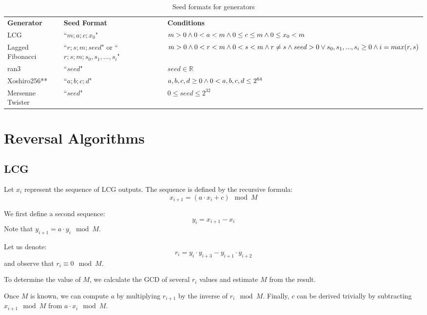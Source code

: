\documentclass[12pt, a4paper]{report}
\begin{document}
\begin{table}
\begin{xltabular}{\textwidth}{| >{\raggedright\arraybackslash}X | >{\raggedright\arraybackslash}X | >{\raggedright\arraybackslash}X |}
	\caption{Seed formats for generators}
	\label{table:1}\\
	\hline
	\bf{Generator} & \bf{Seed Format} & \bf{Conditions} \\
	\hhline{|=|=|=|}
	LCG & 
	``$m;a;c;x_0$" & 
	$m > 0 \wedge\break 0 < a < m \wedge\break 0\leq c \leq m \wedge\break 0 \leq x_0 < m$\\
	\hline
	Lagged Fibonacci & 
	``$r;s;m;seed$" or \break ``$r;s;m;s_0, s_1, ..., s_i$" & 
	$m > 0 \wedge\break 0 < r < m \wedge\break 0 < s < m \wedge\break r \neq s \wedge\break\break seed > 0 \vee\break
	s_0, s_1, ..., s_i \geq 0 \wedge\break i = max(r, s)$\\
	\hline
	ran3 &
	``$seed$" & 
  $seed \in \mathds{R}$\\
	\hline
	Xoshiro256** &
	``$a;b;c;d$" & 
	$a,b,c,d \ge 0 \wedge\break 0 < a,b,c,d \leq 2^{64}$ \\
	\hline
	Mersenne Twister&
	``$seed$" &
	$0 \leq seed \leq 2^{32}$ \\
	\hline
\end{xltabular}
\end{table}

\chapter{Reversal Algorithms}
\section{LCG}
Let $x_i$ represent the sequence of LCG outputs. The sequence is defined by the recursive formula:
$$x_{i+1} = (a \cdot x_i + c) \mod M$$

We first define a second sequence:
$$y_{i} = x_{i+1} - x_{i}$$ 
Note that $y_{i+1} = a \cdot y_{i} \mod M$.

Let us denote:
$$r_i = y_{i} \cdot y_{i+3} - y_{i+1} \cdot y_{i+2}$$
and observe that $r_i \equiv 0 \mod M$.

To determine the value of $M$, we calculate the GCD of several $r_i$ values and estimate $M$ from the result.

Once $M$ is known, we can compute $a$ by multiplying $r_{i+1}$ by the inverse of $r_{i} \mod M$.
Finally, $c$ can be derived trivially by subtracting $x_{i+1} \mod M$ from $a
\cdot x_{i} \mod M$.
\end{document}
